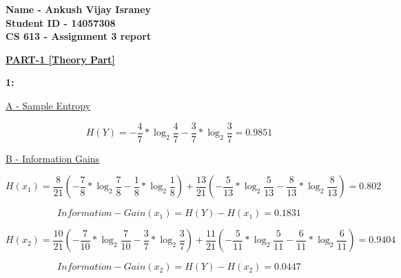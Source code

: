 \documentclass{report}
\begin{document}
 

\begin{flushleft}

\begin{Large}

\textbf{Name - Ankush Vijay Israney} \\
\textbf{Student ID - 14057308} \\
\textbf{CS 613 - Assignment 3 report} \\ 

\end{Large}

\break

\underline { \textbf{PART-1 [Theory Part]}}  \linebreak[2]

\textbf{1:} \linebreak[2]

\underline {A - Sample Entropy}  \linebreak[2]

\begin{equation}
H(Y) = -\frac{4}{7} * \log_2\frac{4}{7} - \frac{3}{7} * \log_2\frac{3}{7} = 0.9851
\end{equation}

\underline {B - Information Gains}  \linebreak[2]

\begin{equation}
H(x_1) = \frac{8}{21}(-\frac{7}{8} * \log_2\frac{7}{8} - \frac{1}{8} * \log_2\frac{1}{8}) 
			+
			\frac{13}{21}(-\frac{5}{13} * \log_2\frac{5}{13} - \frac{8}{13} * \log_2\frac{8}{13}) = 0.802
\end{equation}

\begin{equation}
Information-Gain(x_1) = H(Y) - H(x_1) = 0.1831
\end{equation} \linebreak[2]

\begin{equation}
H(x_2) = \frac{10}{21}(-\frac{7}{10} * \log_2\frac{7}{10} - \frac{3}{7} * \log_2\frac{3}{7}) 
			+
			\frac{11}{21}(-\frac{5}{11} * \log_2\frac{5}{11} - \frac{6}{11} * \log_2\frac{6}{11}) = 0.9404
\end{equation}


\begin{equation}
Information-Gain(x_2) = H(Y) - H(x_2) = 0.0447
\end{equation} \linebreak[2]



\end{flushleft}
\end{document}
